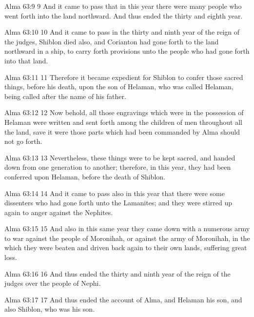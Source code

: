 Alma 63:9
 9 And it came to pass that in this year there were many people
who went forth into the land northward. And thus ended the
thirty and eighth year.

Alma 63:10
 10 And it came to pass in the thirty and ninth year of the reign
of the judges, Shiblon died also, and Corianton had gone forth to
the land northward in a ship, to carry forth provisions unto the
people who had gone forth into that land.

Alma 63:11
 11 Therefore it became expedient for Shiblon to confer those
sacred things, before his death, upon the son of Helaman, who was
called Helaman, being called after the name of his father.

Alma 63:12
 12 Now behold, all those engravings which were in the possession
of Helaman were written and sent forth among the children of men
throughout all the land, save it were those parts which had been
commanded by Alma should not go forth.

Alma 63:13
 13 Nevertheless, these things were to be kept sacred, and handed
down from one generation to another; therefore, in this year,
they had been conferred upon Helaman, before the death of
Shiblon.

Alma 63:14
 14 And it came to pass also in this year that there were some
dissenters who had gone forth unto the Lamanites; and they were
stirred up again to anger against the Nephites.

Alma 63:15
 15 And also in this same year they came down with a numerous
army to war against the people of Moronihah, or against the army
of Moronihah, in the which they were beaten and driven back again
to their own lands, suffering great loss.

Alma 63:16
 16 And thus ended the thirty and ninth year of the reign of the
judges over the people of Nephi.

Alma 63:17
 17 And thus ended the account of Alma, and Helaman his son, and
also Shiblon, who was his son.




